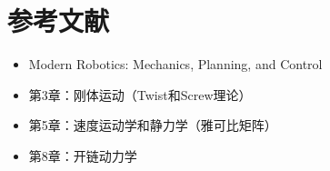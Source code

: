 \documentclass[12pt,a4paper]{article}
\begin{document}
\section{参考文献}

\begin{itemize}
\item Modern Robotics: Mechanics, Planning, and Control
\item 第3章：刚体运动（Twist和Screw理论）
\item 第5章：速度运动学和静力学（雅可比矩阵）
\item 第8章：开链动力学
\end{itemize}
\end{document}

